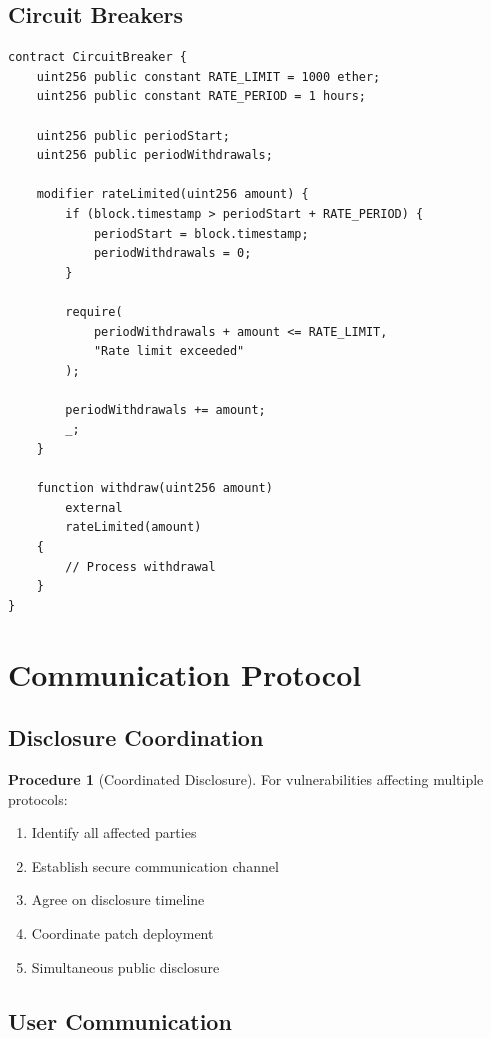 \documentclass[11pt,a4paper]{article}
\theoremstyle{definition}
\newtheorem{procedure}{Procedure}
\begin{document}
\subsection{Circuit Breakers}

\begin{lstlisting}[language=Solidity,basicstyle=\ttfamily\small]
contract CircuitBreaker {
    uint256 public constant RATE_LIMIT = 1000 ether;
    uint256 public constant RATE_PERIOD = 1 hours;

    uint256 public periodStart;
    uint256 public periodWithdrawals;

    modifier rateLimited(uint256 amount) {
        if (block.timestamp > periodStart + RATE_PERIOD) {
            periodStart = block.timestamp;
            periodWithdrawals = 0;
        }

        require(
            periodWithdrawals + amount <= RATE_LIMIT,
            "Rate limit exceeded"
        );

        periodWithdrawals += amount;
        _;
    }

    function withdraw(uint256 amount)
        external
        rateLimited(amount)
    {
        // Process withdrawal
    }
}
\end{lstlisting}

\section{Communication Protocol}

\subsection{Disclosure Coordination}

\begin{procedure}[Coordinated Disclosure]
For vulnerabilities affecting multiple protocols:
\begin{enumerate}
    \item Identify all affected parties
    \item Establish secure communication channel
    \item Agree on disclosure timeline
    \item Coordinate patch deployment
    \item Simultaneous public disclosure
\end{enumerate}
\end{procedure}

\subsection{User Communication}
\end{document}

